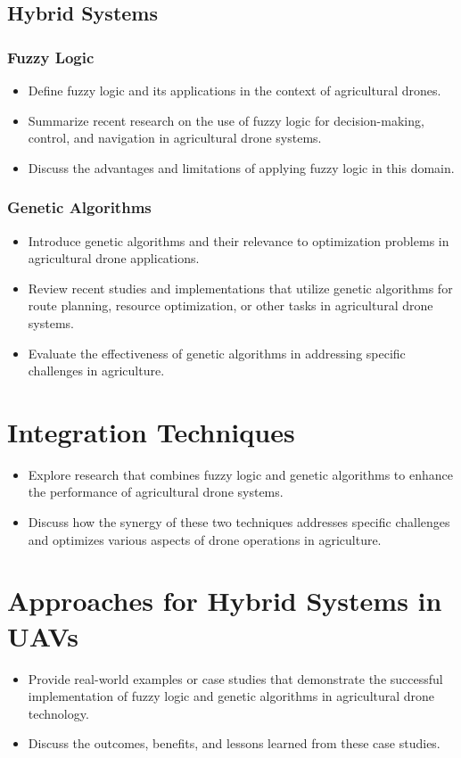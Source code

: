 \documentclass{IEEEtran}
\begin{document}
\subsection{Hybrid Systems}
    \subsubsection{Fuzzy Logic}
        \begin{itemize}
            \item Define fuzzy logic and its applications in the context of agricultural drones.
            \item Summarize recent research on the use of fuzzy logic for decision-making, control, and navigation in agricultural drone systems.
            \item Discuss the advantages and limitations of applying fuzzy logic in this domain.
        \end{itemize}
    \subsubsection{Genetic Algorithms}
        \begin{itemize}
            \item Introduce genetic algorithms and their relevance to optimization problems in agricultural drone applications.
            \item Review recent studies and implementations that utilize genetic algorithms for route planning, resource optimization, or other tasks in agricultural drone systems.
            \item Evaluate the effectiveness of genetic algorithms in addressing specific challenges in agriculture.
        \end{itemize}

\section{Integration Techniques}
    \begin{itemize}
        \item     Explore research that combines fuzzy logic and genetic algorithms to enhance the performance of agricultural drone systems.
        \item Discuss how the synergy of these two techniques addresses specific challenges and optimizes various aspects of drone operations in agriculture.
    \end{itemize}
\section{Approaches for Hybrid Systems in UAVs}
    \begin{itemize}
        \item Provide real-world examples or case studies that demonstrate the successful implementation of fuzzy logic and genetic algorithms in agricultural drone technology.
        \item Discuss the outcomes, benefits, and lessons learned from these case studies.
    \end{itemize}
\end{document}
